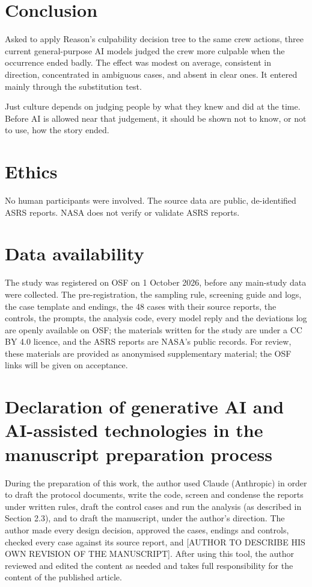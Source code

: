 \documentclass[review,12pt]{elsarticle}
\begin{document}
\hypertarget{conclusion}{%
\section{Conclusion}\label{conclusion}}

Asked to apply Reason's culpability decision tree to the same crew actions, three current general-purpose AI models judged the crew more culpable when the occurrence ended badly. The effect was modest on average, consistent in direction, concentrated in ambiguous cases, and absent in clear ones. It entered mainly through the substitution test.

Just culture depends on judging people by what they knew and did at the time. Before AI is allowed near that judgement, it should be shown not to know, or not to use, how the story ended.

\section*{Ethics}
No human participants were involved. The source data are public, de-identified ASRS reports. NASA does not verify or validate ASRS reports.

\section*{Data availability}
The study was registered on OSF on 1 October 2026, before any main-study data were collected. The pre-registration, the sampling rule, screening guide and logs, the case template and endings, the 48 cases with their source reports, the controls, the prompts, the analysis code, every model reply and the deviations log are openly available on OSF; the materials written for the study are under a CC BY 4.0 licence, and the ASRS reports are NASA's public records. For review, these materials are provided as anonymised supplementary material; the OSF links will be given on acceptance.

\section*{Declaration of generative AI and AI-assisted technologies in the manuscript preparation process}
During the preparation of this work, the author used Claude (Anthropic) in order to draft the protocol documents, write the code, screen and condense the reports under written rules, draft the control cases and run the analysis (as described in Section 2.3), and to draft the manuscript, under the author's direction. The author made every design decision, approved the cases, endings and controls, checked every case against its source report, and [AUTHOR TO DESCRIBE HIS OWN REVISION OF THE MANUSCRIPT]. After using this tool, the author reviewed and edited the content as needed and takes full responsibility for the content of the published article.
\end{document}
